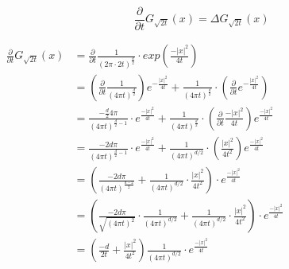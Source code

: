 \documentclass[
 ngerman]{report}
\begin{document}
\newcommand{\Dt}{\frac {\partial} {\partial t}}
$$\Dt G_{\sqrt{2t}} (x) = \Delta G_{\sqrt{2t}} (x) $$
\begin{minipage}{0.5\linewidth}
  \small
	$ \begin{aligned}
		\Dt G_{\sqrt{2t}} (x) 
		&=  \Dt \frac {1} {(2\pi\cdot 2t)^{ \frac {d} {2}}}\cdot 
		exp({ \frac {-|x|^2} {4t}})
		\\
		&= \left(\Dt \frac {1} {(4 \pi t)^{ \frac {d} {2}}}\right)
		e^{ -\frac {|x|^2} {4t}} + \frac {1} {(4 \pi t)^{ \frac {d} {2}}}\cdot  
		\left(\Dt e^{ -\frac {|x|^2} {4t}}\right)
		\\
		&=  \frac {- \frac {d} {2}4\pi } {(4\pi t)^{ \frac {d} {2} - 1}} \cdot 
		e^{ \frac {-|x|^2} {4t}}
		+ \frac {1} {(4 \pi t)^{ \frac {d} {2}}}\cdot  
		\left(\Dt \frac {-|x|^2} {4t}\right)e^{ \frac {-|x|^2} {4t}}
		\\
		&=  \frac {-2d\pi } {(4\pi t)^{ \frac {d} {2} - 1}} \cdot 
		e^{ \frac {-|x|^2} {4t}} + \frac {1} {(4 \pi t)^{d/2}}\cdot  
		\left(\frac {|x|^2} {4t^2}\right)e^{ \frac {-|x|^2} {4t}}
		\\
		&=  \left(\frac {-2d\pi } {(4\pi t)^{ \frac {d-2} {2}}} 
		+ \frac {1} {(4 \pi t)^{d/2}}\cdot  
		\frac {|x|^2} {4t^2} \right ) \cdot e^{ \frac {-|x|^2} {4t}}
		\\
		&=  \left(\frac {-2d \pi } {\sqrt{(4\pi t)^2}} \cdot 
		\frac {1} {(4 \pi t)^{d/2}} + \frac {1} {(4 \pi t)^{d/2}}\cdot  
		\frac {|x|^2} {4t^2} \right ) \cdot e^{ \frac {-|x|^2} {4t}}
		\\
		&=  \left(\frac {-d } {2t} + \frac {|x|^2} {4t^2} \right )
		\frac {1} {(4 \pi t)^{d/2}}\cdot e^{ \frac {-|x|^2} {4t}}
		\\
	\end{aligned} $
\end{minipage}
\small
\end{document}
